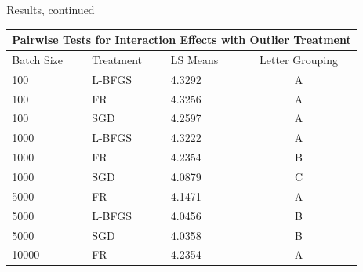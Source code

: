 \documentclass[final]{beamer}
\newlength{\sepwidth}
\newlength{\colwidth}
\newcommand{\separatorcolumn}{\begin{column}{\sepwidth}\end{column}}
\begin{document}
\begin{frame}[t]
\begin{columns}[t]
    \separatorcolumn

    \begin{column}{\colwidth}
      \begin{block}{Results, continued}
        \begin{table}[]
          \begin{tabular}{|llll|}
            \hline
            \multicolumn{4}{|c|}{\textbf{Pairwise Tests for Interaction Effects with Outlier Treatment}}                                             \\ \hline
            \multicolumn{1}{|l|}{Batch Size} & \multicolumn{1}{l|}{Treatment} & \multicolumn{1}{l|}{LS Means} & \multicolumn{1}{c|}{Letter Grouping} \\ \hline
            \multicolumn{1}{|l|}{100}        & \multicolumn{1}{l|}{L-BFGS}    & \multicolumn{1}{l|}{4.3292}   & \multicolumn{1}{c|}{A}               \\
            \multicolumn{1}{|l|}{100}        & \multicolumn{1}{l|}{FR}        & \multicolumn{1}{l|}{4.3256}   & \multicolumn{1}{c|}{A}               \\
            \multicolumn{1}{|l|}{100}        & \multicolumn{1}{l|}{SGD}       & \multicolumn{1}{l|}{4.2597}   & \multicolumn{1}{c|}{A}               \\ \hline
            \multicolumn{1}{|l|}{1000}       & \multicolumn{1}{l|}{L-BFGS}    & \multicolumn{1}{l|}{4.3222}   & \multicolumn{1}{c|}{A}               \\
            \multicolumn{1}{|l|}{1000}       & \multicolumn{1}{l|}{FR}        & \multicolumn{1}{l|}{4.2354}   & \multicolumn{1}{c|}{B}               \\
            \multicolumn{1}{|l|}{1000}       & \multicolumn{1}{l|}{SGD}       & \multicolumn{1}{l|}{4.0879}   & \multicolumn{1}{c|}{C}               \\ \hline
            \multicolumn{1}{|l|}{5000}       & \multicolumn{1}{l|}{FR}        & \multicolumn{1}{l|}{4.1471}   & \multicolumn{1}{c|}{A}               \\
            \multicolumn{1}{|l|}{5000}       & \multicolumn{1}{l|}{L-BFGS}    & \multicolumn{1}{l|}{4.0456}   & \multicolumn{1}{c|}{B}               \\
            \multicolumn{1}{|l|}{5000}       & \multicolumn{1}{l|}{SGD}       & \multicolumn{1}{l|}{4.0358}   & \multicolumn{1}{c|}{B}               \\ \hline
            \multicolumn{1}{|l|}{10000}      & \multicolumn{1}{l|}{FR}        & \multicolumn{1}{l|}{4.2354}   & \multicolumn{1}{c|}{A}               \\

\end{tabular}
\end{table}
\end{block}
\end{column}
\end{columns}
\end{frame}
\end{document}
